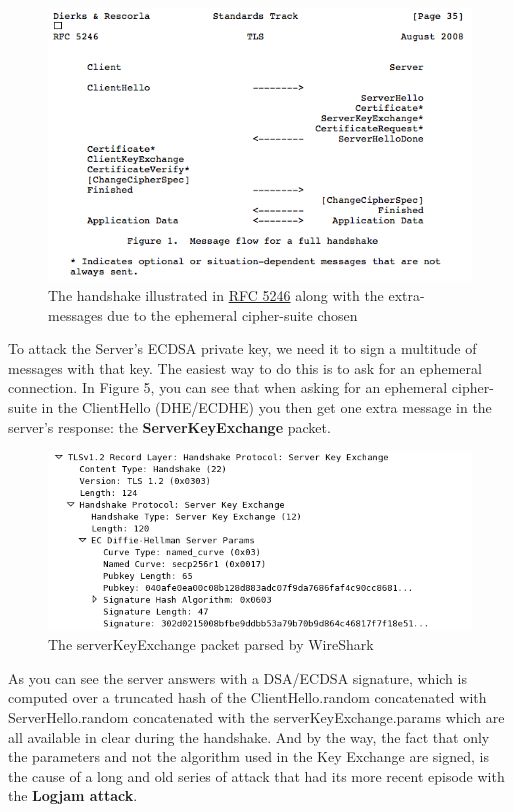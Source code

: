 \documentclass[a4paper,11pt]{article}
\begin{document}
\begin{figure}[H]
\includegraphics[width=\textwidth]{rfc5246.png}
\caption{The handshake illustrated in \href{https://tools.ietf.org/html/rfc5246#section-7.3}{RFC 5246} along with the extra-messages due to the ephemeral cipher-suite chosen}
\end{figure}

To attack the Server's ECDSA private key, we need it to sign a multitude of messages with that key. The easiest way to do this is to ask for an ephemeral connection. In Figure 5, you can see that when asking for an ephemeral cipher-suite in the ClientHello (DHE/ECDHE) you then get one extra message in the server's response: the \textbf{ServerKeyExchange} packet.

\begin{figure}[H]
\includegraphics[width=\textwidth]{serverKeyExchange.png}
\caption{The serverKeyExchange packet parsed by WireShark}
\end{figure}

As you can see the server answers with a DSA/ECDSA signature, which is computed over a truncated hash of the ClientHello.random concatenated with ServerHello.random concatenated with the serverKeyExchange.params which are all available in clear during the handshake. And by the way, the fact that only the parameters and not the algorithm used in the Key Exchange are signed, is the cause of a long and old series of attack that had its more recent episode with the \textbf{Logjam attack}\cite{logjam}.
\end{document}
